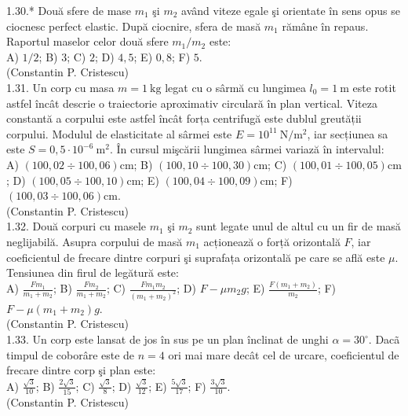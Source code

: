 1.30.* Două sfere de mase $m_{1}$ şi $m_{2}$ având viteze egale şi orientate în sens opus se ciocnesc perfect elastic. După ciocnire, sfera de masă $m_{1}$ rămâne în repaus. Raportul maselor celor două sfere $m_{1} / m_{2}$ este:\\ A) $1 / 2$; B) $3$; C) $2$; D) $4,5$; E) $0,8$; F) $5$.\\ (Constantin P. Cristescu)\\

1.31. Un corp cu masa $m=1 \mathrm{~kg}$ legat cu o sârmă cu lungimea $l_{0}=1 \mathrm{~m}$ este rotit astfel încât descrie o traiectorie aproximativ circulară în plan vertical. Viteza constantă a corpului este astfel încât forța centrifugă este dublul greutății corpului. Modulul de elasticitate al sârmei este $E=10^{11} \mathrm{~N} / \mathrm{m}^{2}$, iar secțiunea sa este $S=0,5 \cdot 10^{-6} \mathrm{~m}^{2}$. În cursul mişcării lungimea sârmei variază în intervalul:\\ A) $(100,02 \div 100,06) \mathrm{cm}$; B) $(100,10 \div 100,30) \mathrm{cm}$; C) $(100,01 \div 100,05) \mathrm{cm}$; D) $(100,05 \div 100,10) \mathrm{cm}$; E) $(100,04 \div 100,09) \mathrm{cm}$; F) $(100,03 \div 100,06) \mathrm{cm}$.\\ (Constantin P. Cristescu)\\

1.32. Două corpuri cu masele $m_{1}$ şi $m_{2}$ sunt legate unul de altul cu un fir de masă neglijabilă. Asupra corpului de masă $m_{1}$ acționează o forță orizontală $F$, iar coeficientul de frecare dintre corpuri şi suprafața orizontală pe care se află este $\mu$. Tensiunea din firul de legătură este:\\ A) $\frac{F m_{1}}{m_{1}+m_{2}}$; B) $\frac{F m_{2}}{m_{1}+m_{2}}$; C) $\frac{F m_{1} m_{2}}{\left(m_{1}+m_{2}\right)^{2}}$; D) $F-\mu m_{2} g$; E) $\frac{F\left(m_{1}+m_{2}\right)}{m_{2}}$; F) $F-\mu\left(m_{1}+m_{2}\right) g$.\\ (Constantin P. Cristescu)\\

1.33. Un corp este lansat de jos în sus pe un plan înclinat de unghi $\alpha=30^{\circ}$. Dacã timpul de coborâre este de $n=4$ ori mai mare decât cel de urcare, coeficientul de frecare dintre corp şi plan este:\\ A) $\frac{\sqrt{3}}{10}$; B) $\frac{2 \sqrt{3}}{15}$; C) $\frac{\sqrt{3}}{8}$; D) $\frac{\sqrt{3}}{12}$; E) $\frac{5 \sqrt{3}}{17}$; F) $\frac{3 \sqrt{3}}{10}$.\\ (Constantin P. Cristescu)\\

